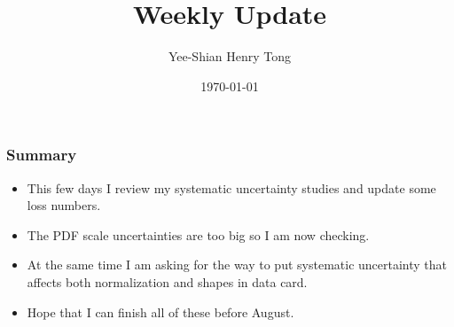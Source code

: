 \documentclass{beamer}
\title[]{Weekly Update} %
\author[Henry Tong]{Yee-Shian Henry Tong} %
\institute[NCU]{ %
  National Central University \\ %
  \medskip
  \textit{NCU HEP Group Meeting} %
}
\date{\today} %
\begin{document}
\begin{frame}
  \vspace*{-1cm}
  \enlargethispage{1cm}
  \titlepage %
\end{frame}


\begin{frame}
  \frametitle{Summary}
  \justifying
  \begin{itemize}
  \item This few days I review my systematic uncertainty studies and update some loss numbers.
  \item The PDF scale uncertainties are too big so I am now checking.
  \item At the same time I am asking for the way to put systematic uncertainty that affects both normalization and shapes in data card.
  \item Hope that I can finish all of these before August.  
  \end{itemize}
\end{frame}
\end{document}
